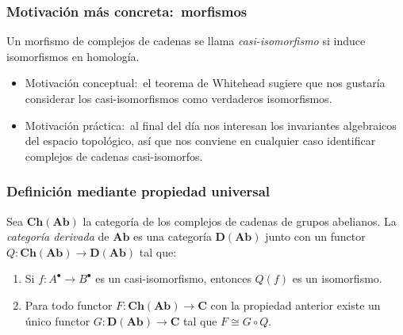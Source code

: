 \documentclass[12pt]{beamer}
\begin{document}
\begin{frame}
  \frametitle{Motivación más concreta:~morfismos}
  Un morfismo de complejos de cadenas se llama \textit{casi-isomorfismo} si induce isomorfismos en homología.
  \pause
  \begin{itemize}
    \item Motivación conceptual:~el teorema de Whitehead sugiere que nos gustaría considerar los casi-isomorfismos como verdaderos isomorfismos.
      \pause
    \item Motivación práctica:~al final del día nos interesan los invariantes algebraicos del espacio topológico, así que nos conviene en cualquier caso identificar complejos de cadenas casi-isomorfos.
  \end{itemize}
\end{frame}

\begin{frame}
  \frametitle{Definición mediante propiedad universal}
  Sea $\mathbf{Ch}(\mathbf{Ab})$ la categoría de los complejos de cadenas de grupos abelianos.
  \pause
  La \textit{categoría derivada} de $\mathbf{Ab}$ es una categoría $\mathbf{D}(\mathbf{Ab})$ junto con un functor $Q \colon \mathbf{Ch}(\mathbf{Ab}) \to \mathbf{D}(\mathbf{Ab})$ tal que:
  \pause
  \begin{enumerate}
    \item Si $f \colon A^{\bullet} \to B^{\bullet}$ es un casi-isomorfismo, entonces $Q(f)$ es un isomorfismo.
      \pause
    \item Para todo functor $F \colon \mathbf{Ch}(\mathbf{Ab}) \to \mathbf{C}$ con la propiedad anterior existe un único functor $G \colon \mathbf{D}(\mathbf{Ab}) \to \mathbf{C}$ tal que $F \cong G \circ Q$.
  \end{enumerate}
  \begin{center}
  \end{center}
\end{frame}
\end{document}
